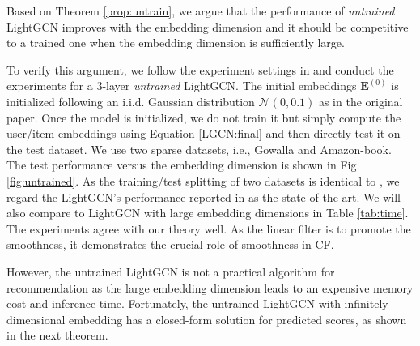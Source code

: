 \documentclass[sigconf]{acmart}
\begin{document}
Based on Theorem \ref{prop:untrain}, we argue that the performance of \emph{untrained} LightGCN improves with the embedding dimension and it should be competitive to a trained one when the embedding dimension is sufficiently large. 

To verify this argument, we follow the experiment settings in \cite{he2020lightgcn} and conduct the experiments for a $3$-layer \emph{untrained} LightGCN. The initial embeddings $\bm{E}^{(0)}$ is initialized following an i.i.d. Gaussian distribution $\mathcal{N}(0,0.1)$ as in the original paper. Once the model is initialized, we do not train it but simply compute the user/item embeddings using Equation \eqref{LGCN:final} and then directly test it on the test dataset. We use two sparse datasets, i.e., Gowalla and Amazon-book. The test performance versus the embedding dimension is shown in Fig. \ref{fig:untrained}. As the training/test splitting of two datasets is identical to \cite{he2020lightgcn}, we regard the LightGCN's performance reported in \cite{he2020lightgcn} as the state-of-the-art. We will also compare to LightGCN with large embedding dimensions in Table \ref{tab:time}. The experiments agree with our theory well. As the linear filter is to promote the smoothness, it demonstrates the crucial role of smoothness in CF.

However, the untrained LightGCN is not a practical algorithm for recommendation as the large embedding dimension leads to an expensive memory cost and inference time. Fortunately, the untrained LightGCN with infinitely dimensional embedding has a closed-form solution for predicted scores, as shown in the next theorem. 
\end{document}
